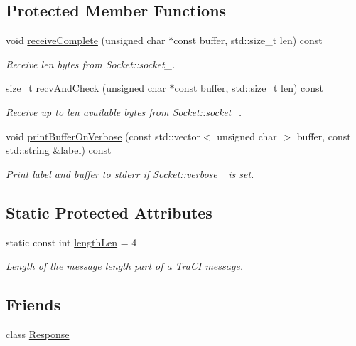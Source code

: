 \subsection*{Protected Member Functions}
\begin{DoxyCompactItemize}
\item 
void \hyperlink{classtcpip_1_1_socket_ac752adee7260dc7e7778f639febc0cf1}{receive\+Complete} (unsigned char $\ast$const buffer, std\+::size\+\_\+t len) const
\begin{DoxyCompactList}\small\item\em Receive {\ttfamily len} bytes from Socket\+::socket\+\_\+. \end{DoxyCompactList}\item 
size\+\_\+t \hyperlink{classtcpip_1_1_socket_a30a24c05b20d9c3ec54239e75268cda8}{recv\+And\+Check} (unsigned char $\ast$const buffer, std\+::size\+\_\+t len) const
\begin{DoxyCompactList}\small\item\em Receive up to {\ttfamily len} available bytes from Socket\+::socket\+\_\+. \end{DoxyCompactList}\item 
void \hyperlink{classtcpip_1_1_socket_a08e08cdc00fd69a51e2cdd8ecb22d1e0}{print\+Buffer\+On\+Verbose} (const std\+::vector$<$ unsigned char $>$ buffer, const std\+::string \&label) const
\begin{DoxyCompactList}\small\item\em Print {\ttfamily label} and {\ttfamily buffer} to stderr if Socket\+::verbose\+\_\+ is set. \end{DoxyCompactList}\end{DoxyCompactItemize}
\subsection*{Static Protected Attributes}
\begin{DoxyCompactItemize}
\item 
static const int \hyperlink{classtcpip_1_1_socket_a93399f14ffe9894df68fec63a05b4203}{length\+Len} = 4
\begin{DoxyCompactList}\small\item\em Length of the message length part of a Tra\+CI message. \end{DoxyCompactList}\end{DoxyCompactItemize}
\subsection*{Friends}
\begin{DoxyCompactItemize}
\item 
class \hyperlink{classtcpip_1_1_socket_a0bb0e5a2fcd99881ef189293e209db7f}{Response}
\end{DoxyCompactItemize}


